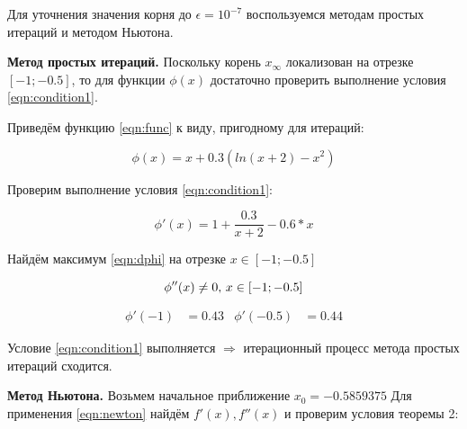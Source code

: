 \documentclass[12pt, a4paper]{article}
\begin{document}
 	Для уточнения значения корня до $\epsilon = 10^{-7}$ воспользуемся методам простых итераций и методом Ньютона.
 	
 	\textbf{Метод простых итераций.} Поскольку корень $x_\infty$ локализован на отрезке $[-1; -0.5]$, то для функции $\phi(x)$ достаточно проверить выполнение условия \eqref{eqn:condition1}.
 	
 	Приведём функцию \eqref{eqn:func} к виду, пригодному для итераций:
 	
 	
 	\begin{equation} \label{eqn:phi}
 		\phi(x) = x+0.3(ln(x+2)-x^2)
 	\end{equation}
 	
 	Проверим выполнение условия \eqref{eqn:condition1}:
 	
 	\begin{equation} \label{eqn:dphi}
 		\phi ' (x) = 1+\frac{0.3}{x+2}-0.6*x
 	\end{equation}
 	
 	Найдём максимум \eqref{eqn:dphi} на отрезке $x \in [-1;-0.5]$
 	
 	\begin{equation}
 		\phi '' (x) \ne 0 , \, x\in [-1;-0.5] \\
 	\end{equation}
 	
 	\begin{align}
 		 \phi'(-1) &= 0.43 & \phi'(-0.5) &= 0.44
 	\end{align}
 	
 	Условие \eqref{eqn:condition1} выполняется $\Rightarrow$ итерационный процесс метода простых итераций сходится.
 	
 	\textbf{Метод Ньютона.} Возьмем начальное приближение $x_0 =-0.5859375$ Для применения \eqref{eqn:newton} найдём $f'(x), f''(x)$ и проверим условия теоремы 2:
 	
\end{document}
